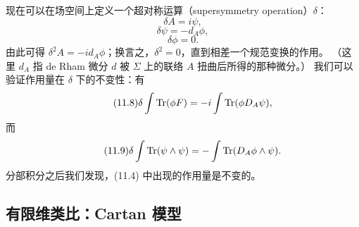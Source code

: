 现在可以在场空间上定义一个超对称运算（supersymmetry operation）$\delta$：
\begin{equation}
  \tag{11.5}
  \label{eq:11-5}
  \delta A=i\psi,
\end{equation}
\begin{equation}
  \tag{11.6}
  \label{eq:11-6}
  \delta\psi=-d_{A}\phi,
\end{equation}
\begin{equation}
  \tag{11.7}
  \label{eq:11-7}
  \delta\phi=0.
\end{equation}
由此可得 $\delta^{2}A=-id_{A}\phi$；换言之，$\delta^{2}=0$，直到相差一个规范变换的作用。
（这里 $d_{A}$ 指 de Rham 微分 $d$ 被 $\Sigma$ 上的联络 $A$ 扭曲后所得的那种微分。）
我们可以验证作用量在 $\delta$ 下的不变性：有
\begin{equation}
  \tag{11.8}
  \label{eq:11-8}
  \delta\int \operatorname{Tr}(\phi F)=-i\int \operatorname{Tr}(\phi D_{A}\psi),
\end{equation}
而
\begin{equation}
  \tag{11.9}
  \label{eq:11-9}
  \delta\int \operatorname{Tr}(\psi\wedge\psi)=-\int \operatorname{Tr}(D_{A}\phi\wedge\psi).
\end{equation}
分部积分之后我们发现，(11.4) 中出现的作用量是不变的。


\subsection{有限维类比：Cartan 模型}


